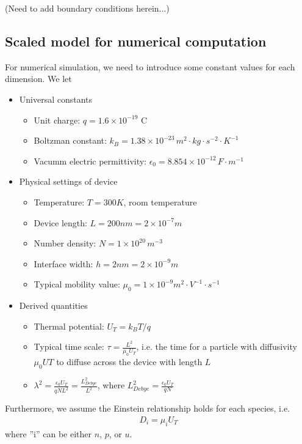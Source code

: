 \documentclass{article}
\begin{document}
 (Need to add boundary conditions herein...)

 
 

  
 
 
 
 \subsection{Scaled model for numerical computation}
 For numerical simulation, we need to introduce some constant values for each dimension. We let
 \begin{itemize}
  \item Universal constants 
     \begin{itemize}
	\item Unit charge: $q = 1.6 \times 10^{-19} $ C
	\item Boltzman constant: $k_B = 1.38 \times 10^{-23} \, m^2\cdot kg\cdot s^{-2}\cdot K^{-1}$
	\item Vacumm electric permittivity: $\epsilon_0 = 8.854 \times 10^{-12} \, F\cdot m^{-1}$
     \end{itemize}
  \item Physical settings of device
      \begin{itemize}
	\item Temperature: $T = 300 K$, room temperature
	\item Device length: $L = 200nm = 2\times10^{-7}m$
	\item Number density: $N=1\times 10^{20}\,m^{-3}$
	\item Interface width: $h=2nm = 2\times10^{-9} m$
	\item Typical mobility value: $\mu_0 = 1\times 10^{-9} m^2\cdot V^{-1}\cdot s^{-1}$
      \end{itemize}
  \item Derived quantities
      \begin{itemize}
	\item Thermal potential: $U_T = k_B T / q$
	\item Typical time scale: $\tau = \frac{L^2}{\mu_0 U_T}$, i.e. the time for a particle with diffusivity 
	  $\mu_0 UT$ to diffuse across the device with length $L$
	\item $\lambda^2 = \frac{\epsilon_0 U_T}{qNL^2} = \frac{L_{Debye}^2}{L^2}$, 
	  where $L_{Debye}^2 = \frac{\epsilon_0 U_T}{q N}$
      \end{itemize}
 \end{itemize}
 Furthermore, we assume the Einstein relationship holds for each species, i.e.
 \begin{align}
  D_i = \mu_i U_T
 \end{align}
 where ''i'' can be either $n$, $p$, or $u$. \\
\end{document}
